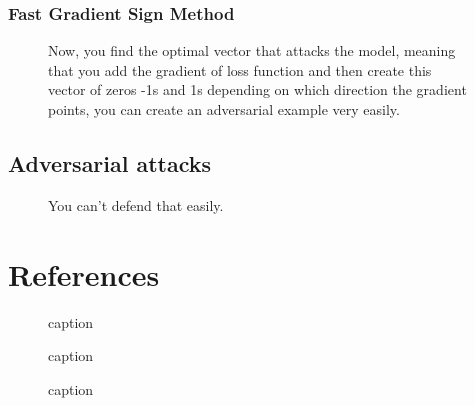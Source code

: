 \documentclass[11pt]{article}
\begin{document}
\subsubsection{Fast Gradient Sign Method}

\begin{figure}[H]
    \centering
    \caption{Now, you find the optimal vector that attacks the model, meaning that you add the gradient of loss function and then create this vector of zeros -1s and 1s depending on which direction the gradient points, you can create an adversarial example very easily.}
\end{figure}

\subsection{Adversarial attacks}

\begin{figure}[H]
    \centering
    \caption{You can't defend that easily.}
\end{figure}

\appendix

\section{References}

\begin{figure}[H]
    \centering
    \caption{caption}
\end{figure}

\begin{figure}[H]
    \centering
    \caption{caption}
\end{figure}

\begin{figure}[H]
    \centering
    \caption{caption}
\end{figure}


\printbibliography
{}
\end{document}
